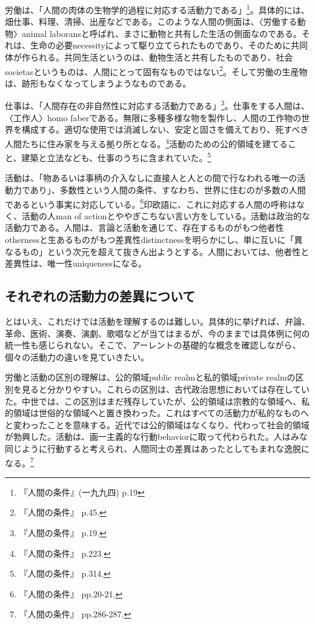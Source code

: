 \documentclass[b5j,twoside,twocolumn]{utarticle}
\begin{document}
労働は、「人間の肉体の生物学的過程に対応する活動力である」\footnote{『人間の条件』(一九九四) p.19}。具体的には、畑仕事、料理、清掃、出産などである。このような人間の側面は、〈労働する動物〉animal laboransと呼ばれ、まさに動物と共有した生活の側面なのである。それは、生命の必要necessityによって駆り立てられたものであり、そのために共同体が作られる。共同生活というのは、動物生活と共有したものであり、社会societasというものは、人間にとって固有なものではない\footnote{『人間の条件』 p.45.}。そして労働の生産物は、跡形もなくなってしまうようなものである。


仕事は、「人間存在の非自然性に対応する活動力である」\footnote{『人間の条件』 p.19.}。仕事をする人間は、〈工作人〉homo faberである。無限に多種多様な物を製作し、人間の工作物の世界を構成する。適切な使用では消滅しない、安定と固さを備えており、死すべき人間たちに住み家を与える拠り所となる。\footnote{『人間の条件』 p.223.}活動のための公的領域を建てること、建築と立法なども、仕事のうちに含まれていた。\footnote{『人間の条件』 p.314.}


活動は、「物あるいは事柄の介入なしに直接人と人との間で行なわれる唯一の活動力であり」、多数性という人間の条件、すなわち、世界に住むのが多数の人間であるという事実に対応している。\footnote{『人間の条件』 pp.20-21.}印欧語に、これに対応する人間の呼称はなく、活動の人man of actionとややぎこちない言い方をしている。活動は政治的な活動力である。人間は、言論と活動を通じて、存在するものがもつ他者性othernessと生あるものがもつ差異性distinctnessを明らかにし、単に互いに「異なるもの」という次元を超えて抜きん出ようとする。人間においては、他者性と差異性は、唯一性uniquenessになる。

\subsection{それぞれの活動力の差異について}
とはいえ、これだけでは活動を理解するのは難しい。具体的に挙げれば、弁論、革命、医術、演奏、演劇、歌唱などが当てはまるが、今のままでは具体例に何の統一性も感じられない。そこで、アーレントの基礎的な概念を確認しながら、個々の活動力の違いを見ていきたい。


労働と活動の区別の理解は、公的領域public realmと私的領域private realmの区別を見ると分かりやすい。これらの区別は、古代政治思想においては存在していた。中世では、この区別はまだ残存していたが、公的領域は宗教的な領域へ、私的領域は世俗的な領域へと置き換わった。これはすべての活動力が私的なものへと変わったことを意味する。近代では公的領域はなくなり、代わって社会的領域が勃興した。活動は、画一主義的な行動behaviorに取って代わられた。人はみな同じように行動すると考えられ、人間同士の差異はあったとしてもまれな逸脱になる。\footnote{『人間の条件』 pp.286-287.}
\end{document}

